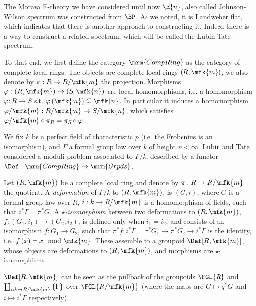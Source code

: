 The Morava E-theory we have considered until now $\E{n}$, also called Johnson-Wilson spectrum was constructed from $\BP$.
As we noted, it is Landweber flat, which indicates that there is another approach to constructing it.
Indeed there is a way to construct a related spectrum, which will be called the Lubin-Tate spectrum.

To that end, we first define the category $\mrm{CompRing}$ as the category of complete local rings.
The objects are complete local rings $\left(R, \mfk{m}\right)$, we also denote by $\pi: R \to R/\mfk{m}$ the projection.
Morphisms $\varphi: \left(R, \mfk{m}\right) \to \left(S, \mfk{n}\right)$ are local homomorphisms, i.e. a homomorphism $\varphi: R \to S$ s.t. $\varphi\left(\mfk{m}\right) \subseteq \mfk{n}$.
In particular it induces a homomorphism $\varphi/\mfk{m}: R/\mfk{m} \to S/\mfk{n}$, which satisfies $\varphi/\mfk{m} \circ \pi_R = \pi_S \circ \varphi$.

We fix $k$ be a perfect field of characteristic $p$ (i.e. the Frobenius is an isomorphism), and $\Gamma$ a formal group law over $k$ of height $n < \infty$.
Lubin and Tate \cite{LT} considered a moduli problem associated to $\Gamma/k$, described by a functor $\Def: \mrm{CompRing} \to \mrm{Grpds}$.

\begin{definition}
	Let $\left(R, \mfk{m}\right)$ be a complete local ring and denote by $\pi: R \to R/\mfk{m}$ the quotient.
	A \emph{deformation} of $\Gamma/k$ to $\left(R, \mfk{m}\right)$, is $\left(G, i\right)$, where $G$ is a formal group law over $R$, $i: k \to R/\mfk{m}$ is a homomorphism of fields, such that $i^* \Gamma = \pi^* G$.
	A \emph{$\star$-isomorphism} between two deformations to $\left(R, \mfk{m}\right)$, $f: \left(G_1, i_1\right) \to \left(G_2, i_2\right)$, is defined only when $i_1 = i_2$, and consists of an isomorphism $f: G_1 \to G_2$, such that $\pi^* f: i^*\Gamma = \pi^* G_1 \to \pi^* G_2 \to i^*\Gamma$ is the identity, i.e. $f\left(x\right) = x \mod \mfk{m}$.
	These assemble to a groupoid $\Def[R, \mfk{m}]$, whose objects are deformations to $\left(R, \mfk{m}\right)$, and morphisms are $\star$-isomorphisms.
\end{definition}

\begin{remark}
	$\Def[R, \mfk{m}]$ can be seen as the pullback of the groupoids $\FGL{R}$ and $\coprod_{i: k \to R/\mfk{m}} \left\{\Gamma\right\}$ over $\FGL{R/\mfk{m}}$ (where the maps are $G \mapsto q^* G$ and $i \mapsto i^* \Gamma$ respectively).
\end{remark}

